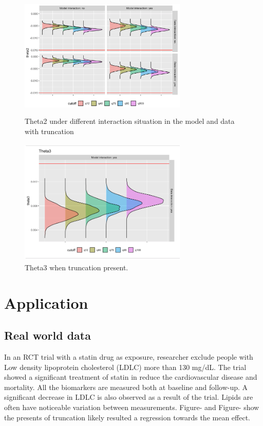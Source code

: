 \documentclass{article}
\begin{document}
\begin{figure}[h]
\centering
\includegraphics[width = 8cm,height = 6cm]{figure-8.png}
\caption{Theta2 under different interaction situation in the model and data with truncation} 
\label{fig8}
\end{figure}


\begin{figure}[h]
\centering
\includegraphics[width = 8cm,height = 6cm]{figure-9.png}
\caption{Theta3 when truncation present.}
\label{fig9}
\end{figure}




\pagebreak
\clearpage

\section{Application}

\subsection{Real world data}

In an RCT trial with a statin drug as exposure, researcher exclude people with Low density lipoprotein cholesterol (LDLC) more than 130 mg/dL.  The trial showed a significant treatment of statin in reduce the cardiovascular disease and mortality. All the biomarkers are measured both at baseline and follow-up. A significant decrease in LDLC is also observed as a result of the trial. Lipids are often have noticeable variation between measurements.  Figure- and Figure- show the presents of truncation likely resulted a regression towards the mean effect. 
\end{document}
